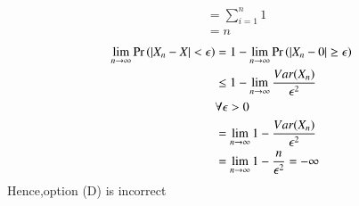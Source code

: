 \documentclass[journal,12pt,Twocolumn]{IEEEtran}
\theoremstyle{remark}
\begin{document}
\begin{enumerate}[label=(\Alph*)]
\begin{align}
&= \sum_{i=1}^{n} 1\\
&= n
\end{align}
\begin{align}
\lim_{n \to \infty} \Pr\left(|X_n - X| <  \epsilon\right)
&=1 - \lim_{n \to \infty} \Pr\left(|X_n-0| \geq  \epsilon\right) \\ 
&\leq 1 - \lim_{n \to \infty} \frac{Var(X_n)}{\epsilon^2} \\
& \forall \epsilon > 0 \\
&=\lim_{n \to \infty} 1 - \frac{Var(X_n)}{\epsilon^2} \\
&=\lim_{n \to \infty} 1 - \frac{n}{\epsilon^2} = -\infty
\end{align} 
Hence,option (D) is incorrect
\end{enumerate}
\end{document}

